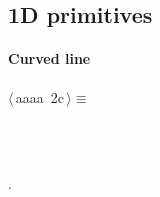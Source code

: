 \documentclass[11pt,oneside]{article}	%
\begin{document}
\subsection{1D primitives}

\paragraph{Curved line}
\begin{flushleft} \small \label{scrap4}
\protect{}$\langle\,$aaaa\nobreak\ {\footnotesize 2c}$\,\rangle\equiv$
\vspace{-1ex}
\begin{list}{}{} \item
\mbox{}\verb@@\\
\mbox{}\verb@@\\
\mbox{}\verb@@{\NWsep}
\end{list}
\vspace{-1ex}
\footnotesize\addtolength{\baselineskip}{-1ex}
\begin{list}{}{\setlength{\itemsep}{-\parsep}\setlength{\itemindent}{-\leftmargin}}
\item {\NWtxtMacroNoRef}.
\end{list}
\end{flushleft}
\end{document}
